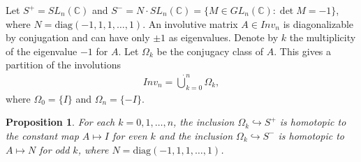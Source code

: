 \documentclass{amsart}
\newcommand{\C}{\mathbb{C}}
\newtheorem{proposition}[theorem]{Proposition}
\theoremstyle{definition}
\begin{document}
Let $S^+ = SL_n(\C)$ and $S^- = N \cdot SL_n(\C) = \{ M \in GL_n(\C): \det M = -1 \}$, where $N = \mathrm{diag}(-1,1,1, \ldots, 1)$. 
An involutive matrix $A \in Inv_n$ is diagonalizable by conjugation and can have only $\pm 1$ as eigenvalues. 
Denote by $k$ the multiplicity of the eigenvalue $-1$ for $A$. Let $\Omega_k$ be the conjugacy class of $A$. This gives a partition of the involutions
\begin{align} \label{Inv-decompos}
   Inv_n = \dot{\bigcup}_{k=0}^n \Omega_k, 
\end{align}
where $\Omega_0 = \{ I \}$ and $\Omega_n = \{ -I \}$. 
\begin{proposition} \label{necessary}
    For each $k = 0, 1, \dots, n$, the inclusion $\Omega_k \hookrightarrow S^+$ is homotopic to the constant map $A \mapsto I$ for even $k$ and the inclusion $\Omega_k \hookrightarrow S^-$ is homotopic to $A \mapsto N$ for odd $k$, where $N = \mathrm{diag}(-1,1,1, \ldots, 1)$.
\end{proposition}
\end{document}
